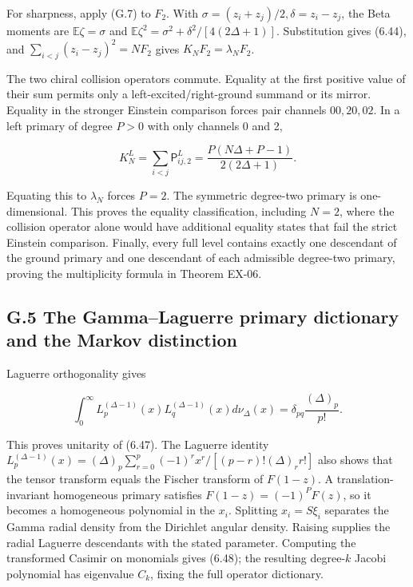 For sharpness, apply (G.7) to \(F_2\). With \(\sigma=(z_i+z_j)/2,\delta=z_i-z_j\), the Beta moments are \(\mathbb E\zeta=\sigma\) and \(\mathbb E\zeta^2=\sigma^2+\delta^2/[4(2\Delta+1)]\). Substitution gives (6.44), and \(\sum_{i<j}(z_i-z_j)^2=NF_2\) gives \(K_NF_2=\lambda_NF_2\).

The two chiral collision operators commute. Equality at the first positive value of their sum permits only a left-excited/right-ground summand or its mirror. Equality in the stronger Einstein comparison forces pair channels \(00,20,02\). In a left primary of degree \(P>0\) with only channels 0 and 2,

\[
K_N^L=\sum_{i<j}\mathsf P_{ij,2}^L
=\frac{P(N\Delta+P-1)}{2(2\Delta+1)}.
\tag{G.10}
\]

Equating this to \(\lambda_N\) forces \(P=2\). The symmetric degree-two primary is one-dimensional. This proves the equality classification, including \(N=2\), where the collision operator alone would have additional equality states that fail the strict Einstein comparison. Finally, every full level contains exactly one descendant of the ground primary and one descendant of each admissible degree-two primary, proving the multiplicity formula in Theorem EX-06.

\hypertarget{g.5-the-gammalaguerre-primary-dictionary-and-the-markov-distinction}{%
\subsection{G.5 The Gamma--Laguerre primary dictionary and the Markov distinction}\label{g.5-the-gammalaguerre-primary-dictionary-and-the-markov-distinction}}

Laguerre orthogonality gives

\[
\int_0^\infty L_p^{(\Delta-1)}(x)L_q^{(\Delta-1)}(x)d\nu_\Delta(x)
=\delta_{pq}\frac{(\Delta)_p}{p!}.
\tag{G.11}
\]

This proves unitarity of (6.47). The Laguerre identity \(L_p^{(\Delta-1)}(x)=(\Delta)_p\sum_{r=0}^p(-1)^rx^r/[ (p-r)!(\Delta)_r r!]\) also shows that the tensor transform equals the Fischer transform of \(F(1-z)\). A translation-invariant homogeneous primary satisfies \(F(1-z)=(-1)^PF(z)\), so it becomes a homogeneous polynomial in the \(x_i\). Splitting \(x_i=S\xi_i\) separates the Gamma radial density from the Dirichlet angular density. Raising supplies the radial Laguerre descendants with the stated parameter. Computing the transformed Casimir on monomials gives (6.48); the resulting degree-\(k\) Jacobi polynomial has eigenvalue \(C_k\), fixing the full operator dictionary.

